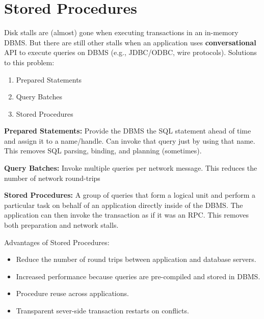 \documentclass[11pt]{article}
\begin{document}
\maketitle
\thispagestyle{plain}

\section{Stored Procedures}
Disk stalls are (almost) gone when executing transactions in an in-memory DBMS.
But there are still other stalls when an application uses \textbf{conversational} API to 
execute queries on DBMS (e.g., JDBC/ODBC, wire protocols).
Solutions to this problem:
\begin{enumerate}
    \item Prepared Statements
    \item Query Batches
    \item Stored Procedures
\end{enumerate}

\textbf{Prepared Statements:}
Provide the DBMS the SQL statement ahead of time and assign it to a name/handle.
Can invoke that query just by using that name.
This removes SQL parsing, binding, and planning (sometimes).
        
\textbf{Query Batches:}
Invoke multiple queries per network message.
This reduces the number of network round-trips
        
\textbf{Stored Procedures:}
A group of queries that form a logical unit and perform a particular task on behalf of an 
application directly inside of the DBMS.
The application can then invoke the transaction as if it was an RPC.
This removes both preparation and network stalls.

Advantages of Stored Procedures:
\begin{itemize}
    \item
    Reduce the number of round trips between application and database servers.
    
    \item
    Increased performance because queries are pre-compiled and stored in DBMS.
    
    \item
    Procedure reuse across applications.
    
    \item
    Transparent sever-side transaction restarts on conflicts.
\end{itemize}
\end{document}
